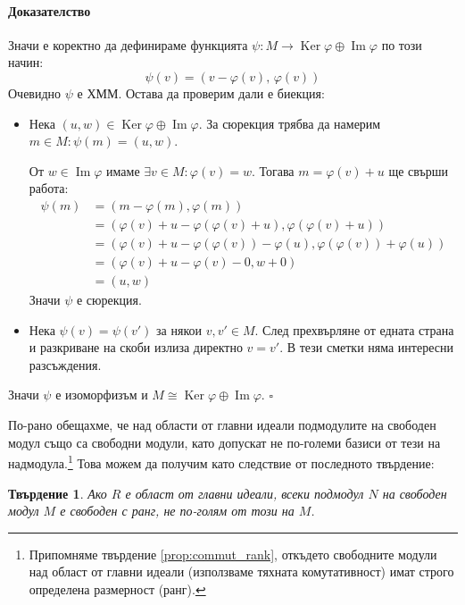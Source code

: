 \documentclass{article}
\newif\ifusemulticols
\theoremstyle{definition}
\theoremstyle{remark}
\theoremstyle{plain}
\theoremstyle{plain}
\newtheorem{prop}[theorem]{Твърдение}
\newenvironment{mymulticols}
    { \ifusemulticols \begin{multicols}{2} \fi }
    { \ifusemulticols \end{multicols} \fi }
\newenvironment{myproof}{\paragraph{Доказателство}}{\hfill$\square$}
\DeclareMathOperator{\Ker}{Ker}
\DeclareMathOperator{\image}{Im}
\begin{document}
\begin{mymulticols}
\begin{myproof}
    Значи е коректно да дефинираме функцията $\psi: M \to {\Ker \varphi \oplus \image \varphi}$ по този начин:
    $$\psi(v) = \left(v-\varphi(v),\,\varphi(v)\right)$$
    Очевидно $\psi$ е ХММ. Остава да проверим дали е биекция:
    \begin{itemize}
        \item Нека $(u, w) \in \Ker\varphi\oplus\image\varphi$.
            За сюрекция трябва да намерим $m\in M: \psi(m) = (u,w)$.

            От $w \in \image\varphi$ имаме $\exists v\in M: \varphi(v) = w$.
            Тогава $m = \varphi(v) + u$ ще свърши работа:
            \begin{align*}
                \psi(m) &= (m-\varphi(m), \varphi(m))\\
                        &= (\varphi(v)+u-\varphi(\varphi(v)+u),
                            \varphi(\varphi(v)+u))\\
                        &= (\varphi(v)+u-\varphi(\varphi(v))-\varphi(u),
                            \varphi(\varphi(v))+\varphi(u))\\
                        &= (\varphi(v)+u-\varphi(v)-0, w+0)\\
                        &= (u,w)
            \end{align*}
            Значи $\psi$ е сюрекция.
        \item Нека $\psi(v) = \psi(v')$ за някои $v, v' \in M$. След прехвърляне от едната страна и разкриване на скоби излиза директно $v = v'$. В тези сметки няма интересни разсъждения.
    \end{itemize}

    Значи $\psi$ е изоморфизъм и $M \cong {\Ker \varphi \oplus \image \varphi}$.
\end{myproof}

По-рано обещахме, че над области от главни идеали подмодулите на свободен модул също са свободни модули, като допускат не по-големи базиси от тези на надмодула.\footnote{Припомняме твърдение \ref{prop:commut_rank}, откъдето свободните модули над област от главни идеали (използваме тяхната комутативност) имат строго определена размерност (ранг).}
Това можем да получим като следствие от последното твърдение:

\begin{prop}
    \label{prop:free_sub}
    Ако $R$ е област от главни идеали, всеки подмодул $N$ на свободен модул $M$ е свободен с ранг,
    не по-голям от този на $M$.
\end{prop}


\end{mymulticols}
\end{document}
